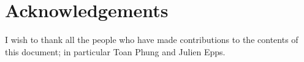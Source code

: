 \chapter*{Acknowledgements}\label{ack}
I wish to thank all the people who have made contributions to the contents
of this document; in particular Toan Phung and Julien Epps.
